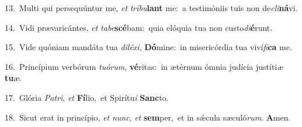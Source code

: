 {\numbfont\textcolor{\numbcolor}{13.}}~Multi qui persequúntur me, \textit{et} \textit{trí}\-\textit{bu}\textbf{lant} me:~\star a testimóniis tuis non de\-\textit{cli}\-\textbf{ná}vi.\par
{\numbfont\textcolor{\numbcolor}{14.}}~Vidi prævaricántes, \textit{et} \textit{ta}\-\textit{be}\textbf{scé}bam:~\star quia elóquia tua non custo\-\textit{di}\-\textbf{é}runt.\par
{\numbfont\textcolor{\numbcolor}{15.}}~Vide quóniam mandáta tua \textit{di}\-\textit{lé}\textit{xi}, \textbf{Dó}\-mine:~\star in misericórdia tua viví\-\textit{fi}\-\textbf{ca} me.\par
{\numbfont\textcolor{\numbcolor}{16.}}~Princípium verbórum \textit{tu}\-\textit{ó}\textit{rum}, \textbf{vé}\-ritas:~\star in ætérnum ómnia judícia justíti\textit{æ} \textbf{tu}\-æ.\par
{\numbfont\textcolor{\numbcolor}{17.}}~Glória \textit{Pa}\-\textit{tri}, \textit{et} \textbf{Fí}\-lio,~\star et Spirítu\textit{i} \textbf{Sanc}\-to.\par
{\numbfont\textcolor{\numbcolor}{18.}}~Sicut erat in princípio, \textit{et} \textit{nunc}\-, \textit{et} \textbf{sem}\-per,~\star et in sǽcula sæculó\-\textit{rum}\-. \textbf{A}\-men.\par
